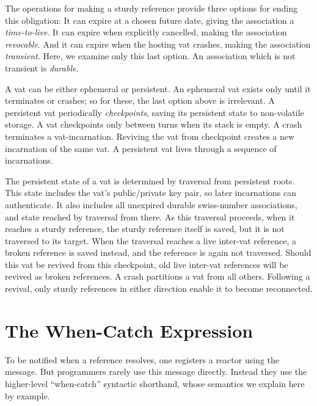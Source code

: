 \documentclass{llncs}
\begin{document}
The operations for making a sturdy reference provide three options for
ending this obligation: It can expire at a chosen future date, giving
the association a \emph{time-to-live}. It can expire when explicitly
cancelled, making the association \emph{revocable}. And it can expire
when the hosting vat crashes, making the association
\emph{transient}. Here, we examine only this last option. An
association which is not transient is \emph{durable}.

A vat can be either ephemeral or persistent. An ephemeral vat exists
only until it terminates or crashes; so for these, the last option
above is irrelevant. A persistent vat periodically \emph{checkpoints},
saving its persistent state to non-volatile storage. A vat checkpoints
only between turns when its stack is empty. A crash terminates a
vat-incarnation. Reviving the vat from checkpoint creates a new
incarnation of the same vat. A persistent vat lives through a sequence
of incarnations.

The persistent state of a vat is determined by traversal from
persistent roots. This state includes the vat's public/private key
pair, so later incarnations can authenticate. It also includes all
unexpired durable swiss-number associations, and state reached by
traversal from there. As this traversal proceeds, when it reaches a
sturdy reference, the sturdy reference itself is saved, but it is not
traversed to its target. When the traversal reaches a live inter-vat
reference, a broken reference is saved instead, and the reference is
again not traversed. Should this vat be revived from this checkpoint,
old live inter-vat references will be revived as broken references. A
crash partitions a vat from all others. Following a revival, only
sturdy references in either direction enable it to become reconnected.

\section{The When-Catch Expression}

To be notified when a reference resolves, one registers a reactor
using the  message. But programmers rarely
use this message directly. Instead they use the higher-level
``when-catch'' syntactic shorthand, whose semantics we explain here by
example.
\end{document}
